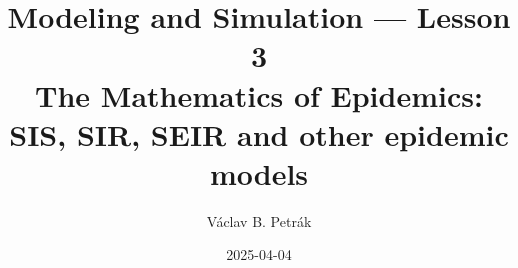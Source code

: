 \documentclass[11pt]{beamer}
\title{
Modeling and Simulation --- Lesson 3\\
\textbf{The Mathematics of Epidemics:\\
SIS, SIR,  SEIR and other epidemic models}}
\author{Václav B. Petrák}
\institute{Faculty of Biomedical Engineering\\
Czech Technical University}
\date{2025-04-04}
\begin{document}
\begin{frame}
  \titlepage
\end{frame}




\end{document}
